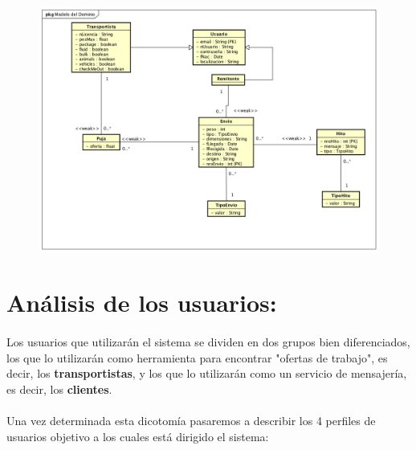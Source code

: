 \documentclass[10pt, a4paper,spanish]{article}
\begin{document}
		\begin{figure}[H]
			\centering
				\includegraphics[width=\textwidth]{astah/entidad_relacion.png}
		\end{figure}


	\section{Análisis de los usuarios:}

		\paragraph{}
		Los usuarios que utilizarán el sistema se dividen en dos grupos bien diferenciados, los que lo utilizarán como herramienta para encontrar "ofertas de trabajo", es decir, los \textbf{transportistas}, y los que lo utilizarán como un servicio de mensajería, es decir, los \textbf{clientes}.

		\paragraph{}
		Una vez determinada esta dicotomía pasaremos a describir los 4 perfiles de usuarios objetivo a los cuales está dirigido el sistema:
\end{document}
